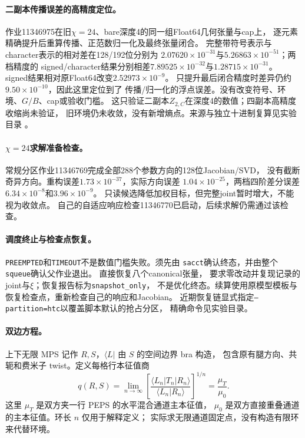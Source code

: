 \paragraph{二副本传播误差的高精度定位。}
作业11346975在旧$\chi=24$、bare深度4的同一组Float64几何张量与cap上，
逐元素精确提升后重算传播、正范数归一化及最终张量闭合。
完整带符号表示与character表示的相对差在128/192位分别为
$2.07620\times10^{-31}$与$5.26863\times10^{-51}$；两档精度的
signed/character结果分别相差$7.89525\times10^{-32}$与$1.28715\times10^{-31}$。
signed结果相对原Float64改变$2.52973\times10^{-9}$。
只提升最后闭合精度时差异仍约$9.50\times10^{-10}$，因此这里定位到了
传播/归一化的浮点误差。没有改变符号、环境、$G/B$、cap或验收门槛。
这只验证二副本$Z_{2,C}$在深度4的数值；四副本高精度收缩尚未验证，
旧环境仍未收敛，没有新增熵点。来源与独立十进制复算见实验目录
。

\paragraph{$\chi=24$求解准备检查。}
常规分区作业11346769完成全部288个参数方向的128位Jacobian/SVD，
没有截断奇异方向。重构误差$1.73\times10^{-37}$，实际方向误差
$1.04\times10^{-25}$，两档四阶差分误差$6.34\times10^{-8}$和$3.96\times10^{-9}$。
只读候选降低加权目标，但完整joint暂时增大，不能视为收敛点。
自己的自适应响应检查11346770已启动，后续求解仍需通过该检查。

\paragraph{调度终止与检查点恢复。}
\texttt{PREEMPTED}和\texttt{TIMEOUT}不是数值门槛失败。须先由
\texttt{sacct}确认终态，并由整个\texttt{squeue}确认父作业退出。
直接恢复八个canonical张量，
要求零改动并复现记录的joint与$\xi$；恢复报告标为\texttt{snapshot\_only}，
不是优化终态。续算使用原模型模板与恢复检查点，重新检查自己的响应和Jacobian。
近期恢复链显式指定\texttt{--partition=htc}以覆盖脚本默认的抢占分区，
精确命令见实验目录。

\paragraph{双边方程。}
上下无限 MPS 记作 $R,S$，$\langle L|$ 由 $S$ 的空间边界 bra 构造，
包含原有腿方向、共轭和费米子 twist。定义每格行本征值商
\begin{equation}
 q(R,S)=\lim_{n\to\infty}
 \left[\frac{\langle L_n|T_n|R_n\rangle}
 {\langle L_n|R_n\rangle}\right]^{1/n}
 =\frac{\mu_T}{\mu_0}.
\end{equation}
这里 $\mu_T$ 是双方夹一行 PEPS 的水平混合通道主本征值，
$\mu_0$ 是双方直接重叠通道的主本征值。环长 $n$ 仅用于解释定义；
实际求无限通道固定点，没有构造有限环来代替环境。

